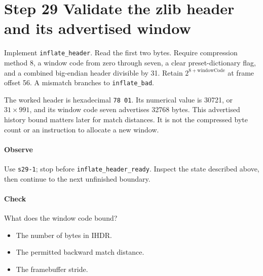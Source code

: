 \section{Step 29 Validate the zlib header and its advertised window}\label{png-inflate-s29}
Implement \texttt{inflate\_header}. Read the first two bytes. Require compression method 8, a window code from zero through seven, a clear preset-dictionary flag, and a combined big-endian header divisible by 31. Retain $2^{8+\mathrm{windowCode}}$ at frame offset 56. A mismatch branches to \texttt{inflate\_bad}.

The worked header is hexadecimal \texttt{78 01}. Its numerical value is 30721, or $31\times991$, and its window code seven advertises 32768 bytes. This advertised history bound matters later for match distances. It is not the compressed byte count or an instruction to allocate a new window.

\paragraph{Observe} Use \texttt{s29-1}; stop before \texttt{inflate\_header\_ready}. Inspect the state described above, then continue to the next unfinished boundary.

\paragraph{Check} What does the window code bound?
\begin{itemize}
\item[A.] The number of bytes in IHDR.
\item[B.] The permitted backward match distance.
\item[C.] The framebuffer stride.
\end{itemize}
